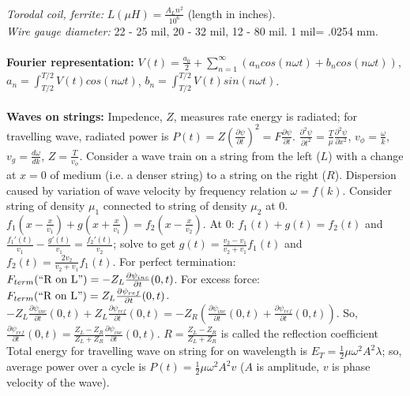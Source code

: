 \\
\emph{Torodal coil, ferrite:} $L(\mu H)= {\frac {A_L n^2}{10^6}}$ (length in inches). 
\\
\emph{Wire gauge
diameter:} 22 - 25 mil, 20 - 32 mil, 12 - 80 mil.  1 mil= .0254 mm.
\\
\\
{\bf Fourier representation:} $V(t)= {\frac {a_0}{2}} + \sum_{n=1}^{\infty} (
a_n cos(n \omega t) + b_n cos(n \omega t))$, 
$a_n= \int_{T/2}^{T/2} V(t) cos(n \omega t)$,
$b_n= \int_{T/2}^{T/2} V(t) sin(n \omega t)$.
\\
\\
{\bf Waves on strings:}  Impedence, $Z$, measures rate energy is radiated;
for travelling wave, radiated power is
$P(t)= Z ({\frac {\partial \psi} {\partial t}})^2= F {\frac {\partial \psi} {\partial t}}$.
$ {\frac {\partial^2 \psi} {\partial t^2}} =
{\frac T {\mu}} {\frac {\partial^2 \psi} {\partial x^2}}$,
$v_{\phi}={\frac \omega k}$,
$v_{g}={\frac {d\omega} {dk}}$, $Z= {\frac {T} {v_{\phi}}}$.
Consider a wave train on a string from the left ($L$) with a change
at $x=0$ of medium (i.e. a denser string) to a string on the right ($R$).
Dispersion caused by variation of wave velocity by frequency
relation $\omega= f(k)$.  Consider string of density $\mu_1$ connected
to string of density $\mu_2$ at $0$.  $f_1(x-{\frac {x} {v_1}}) + g(x+{\frac {x} {v_1}})
= f_2 (x- {\frac {x} {v_2}})$.  At $0$: $f_1(t)+g(t)=f_2(t)$ and
${\frac {f_1'(t)} {v_1}}-{\frac {g'(t)} {v_1}} = {\frac {f_2'(t)} {v_2}}$;
solve to get $g(t)= {\frac {v_2 - v_1} {v_2+v_1}} f_1(t)$ and
$f_2(t)= {\frac {2v_2} {v_2+v_1}} f_1(t)$.
For perfect termination:
$F_{\small {term}} (\textnormal{``R on L''})= -
Z_L {\frac {\partial \psi_{inc}} {\partial t}} (0,t)$.
For excess force:
$F_{\small{term}} (\textnormal{``R on L''})= Z_L 
{\frac {\partial \psi_{ref}} {\partial t}} (0,t)$.
$-Z_L {\frac {\partial \psi_{inc}} {\partial t}} (0,t)+
Z_L {\frac {\partial \psi_{ref}} {\partial t}} (0,t) =
-Z_R ({\frac {\partial \psi_{inc}} {\partial t}} (0,t)+
{\frac {\partial \psi_{ref}} {\partial t}} (0,t))$.  So,
${\frac {\partial \psi_{ref}} {\partial t}} (0,t)=
{\frac {Z_L - Z_R} {Z_L + Z_R}}
{\frac {\partial \psi_{inc}} {\partial t}} (0,t)$.
$R= {\frac {Z_L - Z_R} {Z_L + Z_R}}$ is called the reflection coefficient
Total energy for travelling wave on string for on wavelength is
$E_T= {\frac 1 2} \mu \omega^2 A^2 \lambda$; so, average power over a
cycle is $P(t)= {\frac 1 2} \mu \omega^2 A^2 v$ ($A$ is amplitude, $v$ is
phase velocity of the wave). \\
